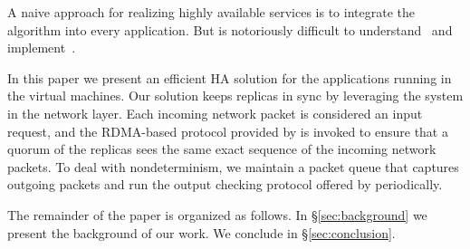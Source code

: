 A naive approach for realizing highly available services is to integrate the \paxos algorithm 
into every application. But \paxos is notoriously difficult to understand~\cite{raft:usenix14} 
and implement~\cite{paxos:practical}.

In this paper we present an efficient HA solution for the applications running in the virtual machines. 
Our solution keeps replicas in sync by leveraging the \smr system \smrsystem in the network layer. Each incoming 
network packet is considered an input request, and the RDMA-based \paxos protocol provided by \smrsystem is invoked 
to ensure that a quorum of the replicas sees the same exact sequence of the incoming network packets. To 
deal with nondeterminism, we maintain a packet queue that captures outgoing packets and run the output 
checking protocol offered by \smrsystem periodically.

The remainder of the paper is organized as follows. In \S\ref{sec:background} we present the background 
of our work. We conclude in \S\ref{sec:conclusion}.
